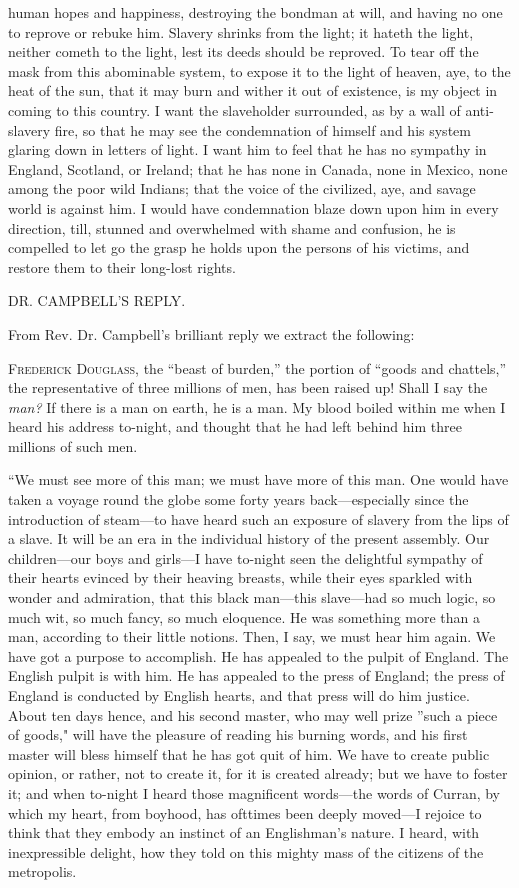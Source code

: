human hopes and happiness, destroying the bondman at will, and having no
one to reprove or rebuke him. Slavery shrinks from the light; it hateth
the light, neither cometh to the light, lest its deeds should be
reproved. To tear off the mask from this abominable system, to expose it
to the light of heaven, aye, to the heat of the sun, that it may burn
and wither it out of existence, is my object in coming to this country.
I want the slaveholder surrounded, as by a wall of anti-slavery fire, so
that he may see the condemnation of himself and his system glaring down
in letters of light. I want him to feel that he has no sympathy in
England, Scotland, or Ireland; that he has none in Canada, none in
Mexico, none among the poor wild Indians; that the voice of the
civilized, aye, and savage world is against him. I would have
condemnation blaze down upon him in every direction, till, stunned and
overwhelmed with shame and confusion, he is compelled to let go the
grasp he holds upon the persons of his victims, and restore them to
their long-lost rights.

{}

DR. CAMPBELL'S REPLY.

From Rev. Dr. Campbell's brilliant reply we extract the following:

\textsc{Frederick Douglass}, the ``beast of burden,'' the portion of
``goods and chattels,'' the representative of three millions of men, has
been raised up! Shall I say the \emph{man?} If there is a man on earth,
he is a man. My blood boiled within me when I heard his address
to-night, and thought that he had left behind him three millions of such
men.

``We must see more of this man; we must have more of this man. One would
have taken a voyage round the globe some forty years back---especially
since the introduction of steam---to have heard such an exposure of
slavery from the lips of a slave. It will be an era in the individual
history of the present assembly. Our children---our boys and girls---I
have to-night seen the delightful sympathy of their hearts evinced by
their heaving breasts, while their eyes sparkled with wonder and
admiration, that this black man---this slave---had so much logic, so
much wit, so much fancy, so much eloquence. He was something more than a
man, according to their little notions. Then, I say, we must hear him
again. We have got a purpose to accomplish. He has appealed to the
pulpit of England. The English pulpit is with him. He has appealed to
the press of England; the press of England is conducted by English
hearts, and that press will do him justice. About ten days hence, and
his second master, who may well prize ''such a piece of goods," will
have the pleasure of reading his burning words, and his first master
will bless himself that he has got quit of him. We have to create public
opinion, or rather, not to create it, for it is created already; but we
have to foster it; and when to-night I heard those magnificent
words---the words of Curran, by which my heart, from boyhood, has
ofttimes been deeply moved---I rejoice to think that they embody an
instinct of an Englishman's nature. I heard, with inexpressible delight,
how they told on this mighty mass of the citizens of the metropolis.

